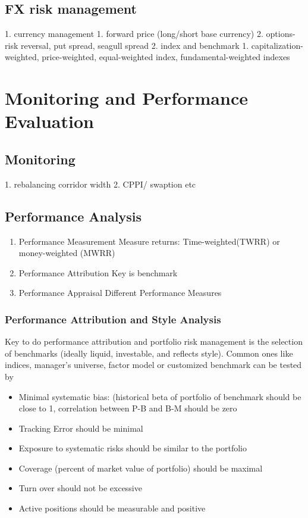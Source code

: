 \documentclass[11pt, openany]{book}              %
\begin{document}
\section{FX risk management}
    1. currency management 
        1. forward price (long/short base currency) 
        2. options- risk reversal, put spread, seagull spread
    2. index and benchmark
        1. capitalization-weighted, price-weighted, equal-weighted index, fundamental-weighted indexes 




\chapter{Monitoring and Performance Evaluation}

\section{Monitoring}
    1. rebalancing corridor width
    2. CPPI/ swaption etc

\section{Performance Analysis}

\begin{enumerate}
 \item Performance Measurement
 \subitem Measure returns: Time-weighted(TWRR) or money-weighted (MWRR)
 \item Performance Attribution
 \subitem Key is benchmark
 \item Performance Appraisal 
 \subitem Different Performance Measures
\end{enumerate}


\subsection{Performance Attribution and Style Analysis} 

Key to do performance attribution and portfolio risk management is the selection of benchmarks (ideally liquid, investable, and reflects style). Common ones like indices, manager's universe, factor model or customized benchmark can be tested by

\begin{itemize}
 \item Minimal systematic bias: (historical beta of portfolio of benchmark should be close to 1, correlation between P-B and B-M should be zero
 \item Tracking Error should be minimal
 \item Exposure to systematic risks should be similar to the portfolio
 \item Coverage (percent of market value of portfolio) should be maximal
 \item Turn over should not be excessive
 \item Active positions should be measurable and positive
 \end{itemize} 
\end{document}
